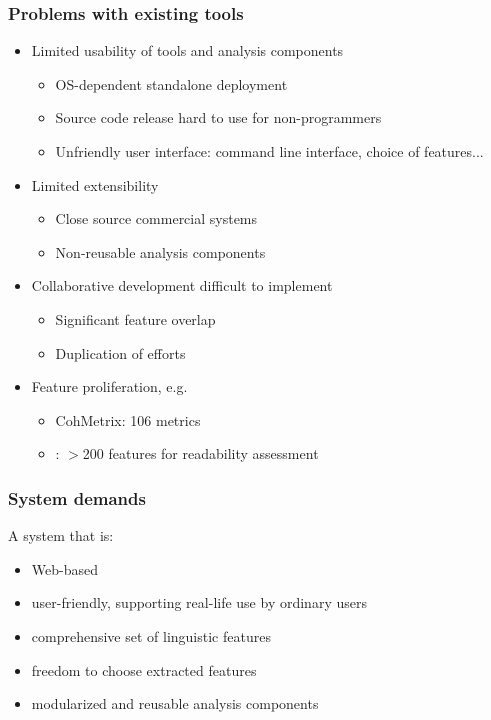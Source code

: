 \documentclass{beamer}
\begin{document}
	\begin{frame}
		\frametitle{Problems with existing tools}

		\begin{itemize}
			\item Limited usability of tools and analysis components
				  \begin{itemize}
					  \item OS-dependent standalone deployment
					  \item Source code release hard to use for non-programmers
					  \item Unfriendly user interface: command line interface,
							choice of features...
				  \end{itemize}
			\item Limited extensibility
				 \begin{itemize}
					 \item Close source commercial systems
					 \item Non-reusable analysis components
				 \end{itemize}
			\item Collaborative development difficult to implement
				 \begin{itemize}
					 \item Significant feature overlap
					 \item Duplication of efforts
				 \end{itemize}
			\item Feature proliferation, e.g.
				  \begin{itemize}
					  \item CohMetrix: 106 metrics
					  \item \citet{Vajjala-15}: $>$200 features for readability
					  assessment
				  \end{itemize}
		\end{itemize}
	\end{frame}

	\begin{frame}
		\frametitle{System demands}

		A system that is: 

		\begin{itemize}
			\item Web-based
			\item user-friendly, supporting real-life use by ordinary users
			\item comprehensive set of linguistic features
			\item freedom to choose extracted features
			\item modularized and reusable analysis components
		\end{itemize}
	\end{frame}
\end{document}
